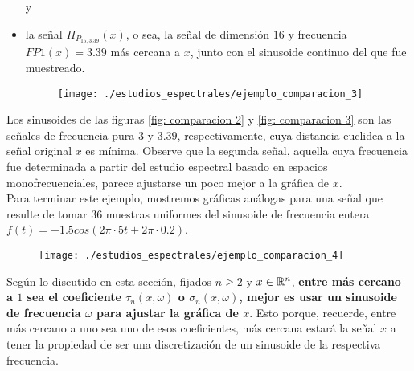\begin{ejemplo}
\begin{itemize}
	y
	\item la señal $\Pi_{P_{16, 3.39}}(x)$, o sea, la señal de
	dimensión $16$ y frecuencia $FP1(x)=3.39$ más cercana a $x$, junto con
	el sinusoide continuo del que fue muestreado.
	\begin{figure}[H]
			\centering
			\texttt{[image: ./estudios\_espectrales/ejemplo\_comparacion\_3]} 
		\end{figure}		
\end{itemize}


Los sinusoides de las figuras \ref{fig: comparacion 2} y
\ref{fig: comparacion 3}
son las señales de frecuencia pura
$3$ y $3.39$, respectivamente, cuya distancia euclidea
a la señal original $x$ es mínima. Observe que la segunda
señal, aquella cuya frecuencia
fue determinada
a partir del estudio espectral basado en espacios
monofrecuenciales,
parece ajustarse un poco mejor a la gráfica de $x$. \\

Para terminar este ejemplo, mostremos gráficas análogas
para una señal que resulte de tomar $36$
muestras uniformes del sinusoide de frecuencia entera
$f(t) = -1.5cos(2 \pi \cdot 5 t + 2\pi \cdot 0.2)$.
	\begin{figure}[H]
			\centering
			\texttt{[image: ./estudios\_espectrales/ejemplo\_comparacion\_4]} 
		\end{figure}	

\final
\end{ejemplo}

\begin{nota}
\label{nota: la mejor frecuencia}
Según lo discutido en esta sección, fijados $n \geq 2$
y $x \in \mathbb{R}^{n}$, \textbf{entre más cercano a $1$ sea 
el coeficiente $\tau_{n}(x, \omega)$ o 
$\sigma_{n}(x, \omega)$, mejor es usar un sinusoide
de frecuencia $\omega$ para ajustar la gráfica de $x$}.
Esto porque, recuerde, entre más cercano a uno sea uno de
esos coeficientes, más cercana estará la señal $x$ a tener
la propiedad de ser una discretización de un sinusoide
de la respectiva frecuencia.
\end{nota}



